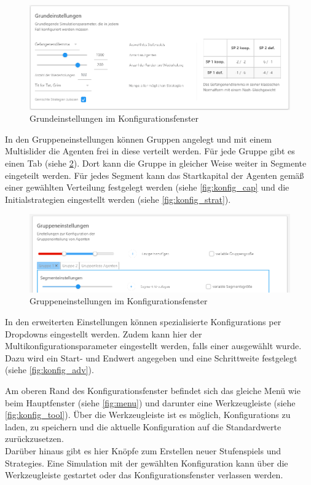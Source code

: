 \documentclass[parskip=full,11pt]{scrartcl}
\begin{document}
\begin{figure}[ht]
	\centering
	\includegraphics[width=\textwidth]{images/konfig_main.png}
	\caption{\label{fig:konfig_main}
		Grundeinstellungen im Konfigurationsfenster}
\end{figure}
\newpage
In den Gruppeneinstellungen können Gruppen angelegt und mit einem \Gls{Multislider} die Agenten frei in diese verteilt werden. Für jede Gruppe gibt es einen Tab (siehe \cref{fig:konfig_group}). Dort kann die Gruppe in gleicher Weise weiter in Segmente eingeteilt werden. Für jedes Segment kann das Startkapital der Agenten gemäß einer gewählten Verteilung festgelegt werden (siehe \cref{fig:konfig_cap} und die Initialstrategien eingestellt werden (siehe \cref{fig:konfig_strat}).



\begin{figure}[ht]
	\centering
	\includegraphics[width=\textwidth]{images/konfig_group.png}
	\caption{\label{fig:konfig_group}
		Gruppeneinstellungen im Konfigurationsfenster}
\end{figure}


In den erweiterten Einstellungen können spezialisierte \Glspl{Konfiguration} per Dropdowns eingestellt werden. Zudem kann hier der Multikonfigurationsparameter eingestellt werden, falls einer ausgewählt wurde. Dazu wird ein Start- und Endwert angegeben und eine Schrittweite festgelegt (siehe \cref{fig:konfig_adv}).

Am oberen Rand des Konfigurationsfenster befindet sich das gleiche Menü wie beim Hauptfenster (siehe \cref{fig:menu}) und darunter eine Werkzeugleiste (siehe \cref{fig:konfig_tool}). Über die Werkzeugleiste ist es möglich, \Glspl{Konfiguration} zu laden, zu speichern und die \gls{aktuelle Konfiguration} auf die Standardwerte zurückzusetzen.\\Darüber hinaus gibt es hier Knöpfe zum Erstellen neuer \Glspl{Stufenspiel} und \Glspl{Strategie}. Eine Simulation mit der gewählten \Gls{Konfiguration} kann über die Werkzeugleiste gestartet oder das Konfigurationsfenster verlassen werden.
\end{document}
